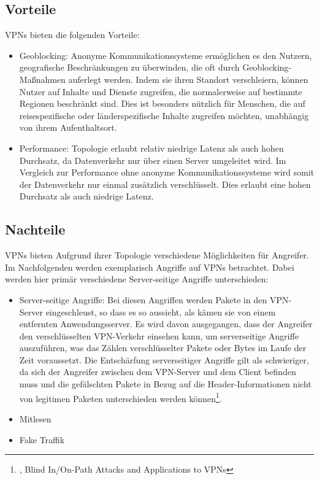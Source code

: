 \subsection{Vorteile}
\label{chap:vpn_advantages}

VPNs bieten die folgenden Vorteile:

\begin{itemize}
    \item Geoblocking: Anonyme Kommunikationssysteme ermöglichen es den Nutzern, geografische Beschränkungen zu überwinden, die oft durch Geoblocking-Maßnahmen auferlegt werden. Indem sie ihren Standort verschleiern, können Nutzer auf Inhalte und Dienste zugreifen, die normalerweise auf bestimmte Regionen beschränkt sind. Dies ist besonders nützlich für Menschen, die auf reisespezifische oder länderspezifische Inhalte zugreifen möchten, unabhängig von ihrem Aufenthaltsort.
    \item Performance: Topologie erlaubt relativ niedrige Latenz als auch hohen Durchsatz, da Datenverkehr nur über einen Server umgeleitet wird. Im Vergleich zur Performance ohne anonyme Kommunikationssysteme wird somit der Datenverkehr nur einmal zusätzlich verschlüsselt. Dies erlaubt eine hohen Durchsatz als auch niedrige Latenz.
\end{itemize}

\subsection{Nachteile}
\label{chap:vpn_disadvantages}

VPNs bieten Aufgrund ihrer Topologie verschiedene Möglichkeiten für Angreifer. Im Nachfolgenden werden exemplarisch Angriffe auf VPNs betrachtet. Dabei werden hier primär verschiedene Server-seitige Angriffe unterschieden:

\begin{itemize}
    \item Server-seitige Angriffe: Bei diesen Angriffen werden Pakete in den VPN-Server eingeschleust, so dass es so aussieht, als kämen sie von einem entfernten Anwendungsserver. Es wird davon ausgegangen, dass der Angreifer den verschlüsselten VPN-Verkehr einsehen kann, um serverseitige Angriffe auszuführen, was das Zählen verschlüsselter Pakete oder Bytes im Laufe der Zeit voraussetzt. Die Entschärfung serverseitiger Angriffe gilt als schwieriger, da sich der Angreifer zwischen dem VPN-Server und dem Client befinden muss und die gefälschten Pakete in Bezug auf die Header-Informationen nicht von legitimen Paketen unterschieden werden können\footnote{\cite{AttacksOnVPNs}, Blind In/On-Path Attacks and Applications to VPNs}.
    \item Mitlesen
    \item Fake Traffik
\end{itemize}
